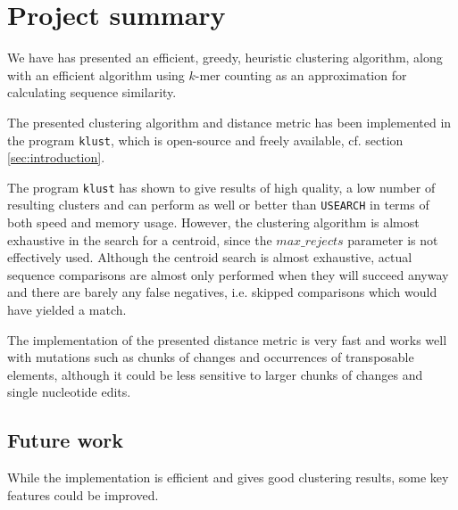\section{Project summary}
\label{sec:conclusions}

We have has presented an efficient, greedy, heuristic clustering algorithm,
along with an efficient algorithm using $k$-mer counting as an approximation
for calculating sequence similarity.

The presented clustering algorithm and distance metric has been implemented in
the program \texttt{klust}, which is open-source and freely available, cf.
section \ref{sec:introduction}.

The program \texttt{klust} has shown to give results of high quality, a low
number of resulting clusters and can perform as well or better than
\texttt{USEARCH} in terms of both speed and memory usage. However, the
clustering algorithm is almost exhaustive in the search for a centroid, since
the $max\_rejects$ parameter is not effectively used. Although the centroid
search is almost exhaustive, actual sequence comparisons are almost only
performed when they will succeed anyway and there are barely any false
negatives, i.e. skipped comparisons which would have yielded a match.

The implementation of the presented distance metric is very fast and works well
with mutations such as chunks of changes and occurrences of transposable
elements, although it could be less sensitive to larger chunks of changes and
single nucleotide edits.


\subsection{Future work}
\label{sec:future_work}

While the implementation is efficient and gives good clustering
results, some key features could be improved.

